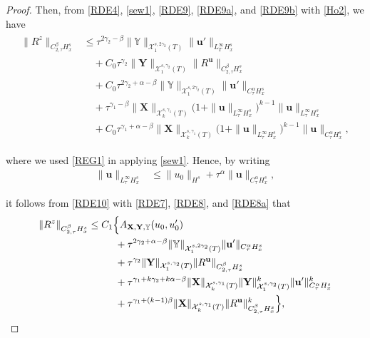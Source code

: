\documentclass[letterpaper, 11pt,  reqno]{amsart}
\newcommand{\1}{\hspace{0.5mm}\textup{I}\hspace{0.5mm}}
\newcommand{\noi}{\noindent}
\newcommand{\al}{\alpha}
\newcommand{\be}{\beta}
\newcommand{\g}{\gamma}
\newcommand{\cX}{\mathcal{X}}
\newcommand{\uu}{\mathbf{u}}
\newcommand{\YYb}{\mathbb{Y}}
\newcommand{\XX}{\mathbf{X}}
\newcommand{\YY}{\mathbf{Y}}
\numberwithin{equation}{section}
\numberwithin{theorem}{section}
\begin{document}
\begin{proof}
\noi
Then, from \eqref{RDE4},  
\eqref{sew1},
\eqref{RDE9}, 
\eqref{RDE9a}, 
and \eqref{RDE9b}
with 
\eqref{Ho2}, 
we have
\begin{align}
\begin{split}
\| R^z\|_{C^\be_{2, \tau}H^s_x}
& \le \tau^{2\g_2 - \be} \|\YYb\|_{\cX^{s, 2\g_2}_1(T)}\|\uu'\|_{L^\infty_TH^s_x}\\
& \quad + C_0\tau^{\g_2}
\|\YY\|_{\cX^{s, \g_2}_1(T)}
\| R^\uu\|_{C^\be_{2, \tau } H^s_x}\\
& \quad  + C_0\tau^{2\g_2 + \al - \be}
\|\YYb\|_{\cX^{s, 2\g_2}_1(T)}\|\uu'\|_{C^\al_\tau H^s_x}\\
& \quad   + 
\tau^{\g_1 - \be}\|\XX\|_{\cX^{s, \g_1}_k(T)}
\big(1 + \|\uu\|_{L^\infty_\tau H^s_x}\big)^{k-1}
\|\uu\|_{L^\infty_\tau H^s_x}\\
& \quad + C_0
 \tau^{\g_1 + \al - \be} \|\XX\|_{\cX^{s, \g_1}_k(T)}
 \big(1 + \|\uu\|_{L^\infty_\tau H^s_x}\big)^{k-1}
 \|\uu\|_{C^\al_\tau H^s_x}, 
\end{split}
\label{RDE10}
\end{align}


\noi
where we used \eqref{REG1} in applying \eqref{sew1}.
Hence, 
by writing
\begin{align}
\| \uu \|_{L^\infty_\tau H^s_x} 
& \le \|u_0 \|_{H^s} + \tau^\al \| \uu\|_{C^\al_\tau H^s_x}, 
\label{RDE8a}
\end{align}

\noi
it follows 
from \eqref{RDE10} with \eqref{RDE7}, 
\eqref{RDE8}, and \eqref{RDE8a} that 
\begin{align}
\begin{split}
  \| R^z\|_{C^\be_{2, \tau}H^s_x}
&    \le 
C_1  \Big\{ A_{\XX, \YY, \YYb}(u_0, u_0')\\
& 
\hphantom{XXX}
+ \tau^{2\g_2 + \al - \be} 
\|\YYb\|_{\cX^{s, 2\g_2}_1(T)}
 \|\uu '\|_{C^\al_\tau H^s_x}\\
& 
\hphantom{XXX}
 +
 \tau^{\g_2}
\|\YY\|_{\cX^{s, \g_2}_1(T)}
\| R^\uu\|_{C^\be_{2, \tau } H^s_x}\\
& 
\hphantom{XXX}
 + 
 \tau^{\g_1 +k \g_2 + k \al - \be}\|\XX\|_{\cX^{s, \g_1}_k(T)}
 \| \YY\|_{\cX^{s, \g_2}_1(T)}^k 
  \|\uu '\|_{C^\al_\tau H^s_x}^k\\
& 
\hphantom{XXX}
 + 
 \tau^{\g_1  +(k-1) \be}\|\XX\|_{\cX^{s, \g_1}_k(T)}
\| R^\uu\|_{C^\be_{2, \tau } H^s_x}^k\Big\}, 
\end{split}
\label{RDE11}
\end{align}



\end{proof}
\end{document}
